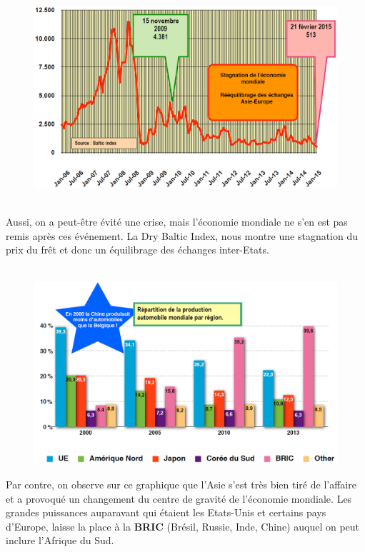 \begin{figure}
\includegraphics[scale=0.26]{25}
\end{figure}
\ \\ Aussi, on a peut-être évité une crise, mais l'économie mondiale ne s'en est pas remis après ces événement. La Dry Baltic Index, nous montre une stagnation du prix du frêt et donc un équilibrage des échanges inter-Etats. \\\\

\begin{figure}
\includegraphics[scale=0.32]{26}
\end{figure}
\noindent Par contre, on observe sur ce graphique que l'Asie s'est très bien tiré de l'affaire et a provoqué un changement du centre de gravité de l'économie mondiale. Les grandes puissances auparavant qui étaient les Etats-Unis et certains pays d'Europe, laisse la place à la \textbf{BRIC} (Brésil, Russie, Inde, Chine) auquel on peut inclure l'Afrique du Sud.  